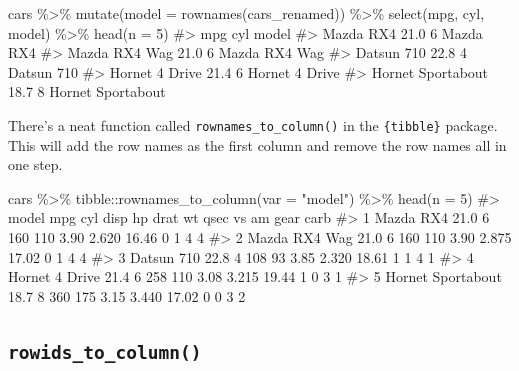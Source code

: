 \documentclass[
  letterpaper,
  DIV=11,
  numbers=noendperiod]{scrreprt}
\newenvironment{Shaded}{\begin{snugshade}}{\end{snugshade}}
\newcommand{\AttributeTok}[1]{\textcolor[rgb]{0.40,0.45,0.13}{#1}}
\newcommand{\CommentTok}[1]{\textcolor[rgb]{0.37,0.37,0.37}{#1}}
\newcommand{\DecValTok}[1]{\textcolor[rgb]{0.68,0.00,0.00}{#1}}
\newcommand{\FunctionTok}[1]{\textcolor[rgb]{0.28,0.35,0.67}{#1}}
\newcommand{\NormalTok}[1]{\textcolor[rgb]{0.00,0.23,0.31}{#1}}
\newcommand{\SpecialCharTok}[1]{\textcolor[rgb]{0.37,0.37,0.37}{#1}}
\newcommand{\StringTok}[1]{\textcolor[rgb]{0.13,0.47,0.30}{#1}}
\begin{document}
\begin{Shaded}
\begin{Highlighting}[]
\NormalTok{cars }\SpecialCharTok{\%\textgreater{}\%} 
  \FunctionTok{mutate}\NormalTok{(}\AttributeTok{model =} \FunctionTok{rownames}\NormalTok{(cars\_renamed)) }\SpecialCharTok{\%\textgreater{}\%} 
  \FunctionTok{select}\NormalTok{(mpg, cyl, model) }\SpecialCharTok{\%\textgreater{}\%} 
  \FunctionTok{head}\NormalTok{(}\AttributeTok{n =} \DecValTok{5}\NormalTok{)}
\CommentTok{\#\textgreater{}                    mpg cyl             model}
\CommentTok{\#\textgreater{} Mazda RX4         21.0   6         Mazda RX4}
\CommentTok{\#\textgreater{} Mazda RX4 Wag     21.0   6     Mazda RX4 Wag}
\CommentTok{\#\textgreater{} Datsun 710        22.8   4        Datsun 710}
\CommentTok{\#\textgreater{} Hornet 4 Drive    21.4   6    Hornet 4 Drive}
\CommentTok{\#\textgreater{} Hornet Sportabout 18.7   8 Hornet Sportabout}
\end{Highlighting}
\end{Shaded}

There's a neat function called \texttt{rownames\_to\_column()} in the
\texttt{\{tibble\}} package. This will add the row names as the first
column and remove the row names all in one step.

\begin{Shaded}
\begin{Highlighting}[]
\NormalTok{cars }\SpecialCharTok{\%\textgreater{}\%} 
\NormalTok{  tibble}\SpecialCharTok{::}\FunctionTok{rownames\_to\_column}\NormalTok{(}\AttributeTok{var =} \StringTok{"model"}\NormalTok{) }\SpecialCharTok{\%\textgreater{}\%} 
  \FunctionTok{head}\NormalTok{(}\AttributeTok{n =} \DecValTok{5}\NormalTok{)}
\CommentTok{\#\textgreater{}               model  mpg cyl disp  hp drat    wt  qsec vs am gear carb}
\CommentTok{\#\textgreater{} 1         Mazda RX4 21.0   6  160 110 3.90 2.620 16.46  0  1    4    4}
\CommentTok{\#\textgreater{} 2     Mazda RX4 Wag 21.0   6  160 110 3.90 2.875 17.02  0  1    4    4}
\CommentTok{\#\textgreater{} 3        Datsun 710 22.8   4  108  93 3.85 2.320 18.61  1  1    4    1}
\CommentTok{\#\textgreater{} 4    Hornet 4 Drive 21.4   6  258 110 3.08 3.215 19.44  1  0    3    1}
\CommentTok{\#\textgreater{} 5 Hornet Sportabout 18.7   8  360 175 3.15 3.440 17.02  0  0    3    2}
\end{Highlighting}
\end{Shaded}

\subsection{\texorpdfstring{\texttt{rowids\_to\_column()}}{rowids\_to\_column()}}\label{rowids_to_column}
\end{document}

